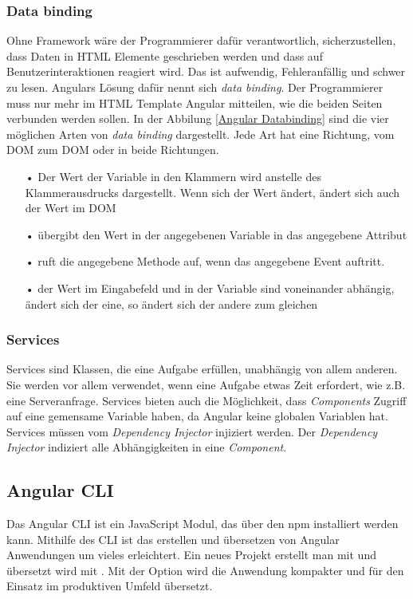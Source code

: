 \subsubsection{Data binding}
\label{sec:ang-data-binding}
Ohne Framework wäre der Programmierer dafür verantwortlich, sicherzustellen, dass Daten in \ac{HTML} Elemente geschrieben werden und dass auf Benutzerinteraktionen reagiert wird. Das ist aufwendig, Fehleranfällig und schwer zu lesen. Angulars Lösung dafür nennt sich \textit{data binding}. Der Programmierer muss nur mehr im \ac{HTML} Template Angular mitteilen, wie die beiden Seiten verbunden werden sollen. In der Abbilung \ref{Angular Databinding} sind die vier möglichen Arten von \textit{data binding} dargestellt. Jede Art hat eine Richtung, vom \ac{DOM} zum \ac{DOM} oder in beide Richtungen.

\begin{itemize}
\item[•]  Der Wert der Variable in den Klammern wird anstelle des Klammerausdrucks dargestellt. Wenn sich der Wert ändert, ändert sich auch der Wert im \ac{DOM}
\item[•]  übergibt den Wert in der angegebenen Variable in das angegebene Attribut
\item[•]  ruft die angegebene Methode auf, wenn das angegebene Event auftritt.
\item[•]  der Wert im Eingabefeld und in der Variable sind voneinander abhängig, ändert sich der eine, so ändert sich der andere zum gleichen
\end{itemize}

\subsubsection{Services}
\label{sec:ang-services}
Services sind Klassen, die eine Aufgabe erfüllen, unabhängig von allem anderen. Sie werden vor allem verwendet, wenn eine Aufgabe etwas Zeit erfordert, wie z.B. eine Serveranfrage. Services bieten auch die Möglichkeit, dass \textit{Components} Zugriff auf eine gemensame Variable haben, da Angular keine globalen Variablen hat. Services müssen vom \textit{Dependency Injector} injiziert werden. Der \textit{Dependency Injector} indiziert alle Abhängigkeiten in eine \textit{Component}.

\subsection{Angular CLI}
\label{sec:vor-angular-cli}
Das Angular \ac{CLI} ist ein JavaScript Modul, das über den \ac{npm} installiert werden kann. Mithilfe des \ac{CLI} ist das erstellen und übersetzen von Angular Anwendungen um vieles erleichtert. Ein neues Projekt erstellt man mit  und übersetzt wird mit . Mit der Option  wird die Anwendung kompakter und für den Einsatz im produktiven Umfeld übersetzt.

